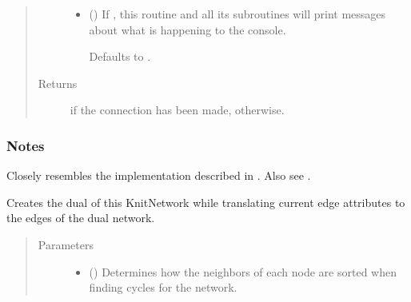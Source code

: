 \documentclass[letterpaper,10pt,english]{sphinxmanual}
\begin{document}
\begin{fulllineitems}
\begin{fulllineitems}
\begin{quote}
\begin{description}
\begin{itemize}
\item {} 
 (\sphinxstyleliteralemphasis{\sphinxupquote{, }}) \textendash{} 
If , this routine and all its subroutines will print
messages about what is happening to the console.

Defaults to .


\end{itemize}

\item[{Returns}] \leavevmode
{} \textendash{}  if the connection has been made,
 otherwise.

\end{description}\end{quote}
\subsubsection*{Notes}

Closely resembles the implementation described in  \sphinxfootnotemark[1]. Also see
 \sphinxfootnotemark[2].

\end{fulllineitems}


\begin{fulllineitems}
\label{\detokenize{cockatoo:cockatoo.KnitNetwork.create_dual}}
Creates the dual of this KnitNetwork while translating current edge
attributes to the edges of the dual network.
\begin{quote}\begin{description}
\item[{Parameters}] \leavevmode\begin{itemize}
\item {} 
 (\sphinxstyleliteralemphasis{\sphinxupquote{, }}) \textendash{} 
Determines how the neighbors of each node are sorted when finding
cycles for the network.


\end{itemize}
\end{description}
\end{quote}
\end{fulllineitems}
\end{fulllineitems}
\end{document}
